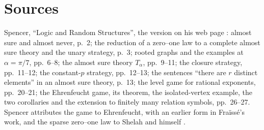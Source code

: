 \section{Sources}
\label{sec:p03-w03-p03-072-sources}

Spencer, ``Logic and Random Structures'', the version on his web page
\cite{Spencer2007LogicRandomStructuresAuthor}: almost sure and almost never,
p.~2; the reduction of a zero--one law to a complete almost sure theory and
the unary strategy, p.~3; rooted graphs and the examples at
\(\alpha=\pi/7\), pp.~6--8; the almost sure theory \(T_\alpha\), pp.~9--11;
the closure strategy, pp.~11--12; the constant-\(p\) strategy,
pp.~12--13; the sentences ``there are \(r\) distinct elements'' in an almost
sure theory, p.~13; the level game for rational exponents, pp.~20--21; the
Ehrenfeucht game, its theorem, the isolated-vertex example, the two
corollaries and the extension to finitely many relation symbols,
pp.~26--27.  Spencer attributes the game to Ehrenfeucht, with an earlier
form in Fra\"iss\'e's work, and the sparse zero--one law to Shelah and
himself \cite[p.~27]{Spencer2007LogicRandomStructuresAuthor}.
